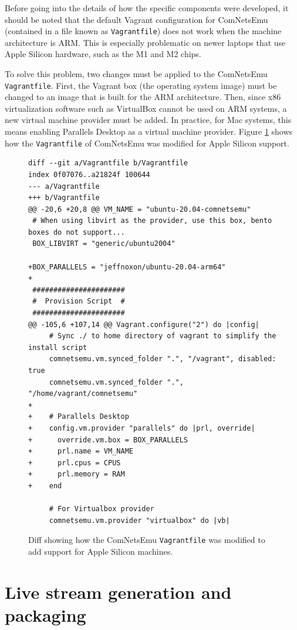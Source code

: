 Before going into the details of how the specific components were developed, it should be noted that the default Vagrant configuration for ComNetsEmu (contained in a file known as \texttt{Vagrantfile}) does not work when the machine architecture is ARM. This is especially problematic on newer laptops that use Apple Silicon hardware, such as the M1 and M2 chips.

To solve this problem, two changes must be applied to the ComNetsEmu \texttt{Vagrantfile}. First, the Vagrant box (the operating system image) must be changed to an image that is built for the ARM architecture. Then, since x86 virtualization software such as VirtualBox cannot be used on ARM systems, a new virtual machine provider must be added. In practice, for Mac systems, this means enabling Parallels Desktop as a virtual machine provider. Figure \ref{fig:vagrantfile} shows how the \texttt{Vagrantfile} of ComNetsEmu was modified for Apple Silicon support.

\begin{figure}[h]
    \centering
    \begin{verbatim}
diff --git a/Vagrantfile b/Vagrantfile
index 0f07076..a21824f 100644
--- a/Vagrantfile
+++ b/Vagrantfile
@@ -20,6 +20,8 @@ VM_NAME = "ubuntu-20.04-comnetsemu"
 # When using libvirt as the provider, use this box, bento boxes do not support...
 BOX_LIBVIRT = "generic/ubuntu2004"

+BOX_PARALLELS = "jeffnoxon/ubuntu-20.04-arm64"
+
 ######################
 #  Provision Script  #
 ######################
@@ -105,6 +107,14 @@ Vagrant.configure("2") do |config|
     # Sync ./ to home directory of vagrant to simplify the install script
     comnetsemu.vm.synced_folder ".", "/vagrant", disabled: true
     comnetsemu.vm.synced_folder ".", "/home/vagrant/comnetsemu"
+
+    # Parallels Desktop
+    config.vm.provider "parallels" do |prl, override|
+      override.vm.box = BOX_PARALLELS
+      prl.name = VM_NAME
+      prl.cpus = CPUS
+      prl.memory = RAM
+    end

     # For Virtualbox provider
     comnetsemu.vm.provider "virtualbox" do |vb|
    \end{verbatim}
    \caption{Diff showing how the ComNetsEmu \texttt{Vagrantfile} was modified to add support for Apple Silicon machines.}
    \label{fig:vagrantfile}
\end{figure}


\section{Live stream generation and packaging}
\label{sec:testbed/packaging}


